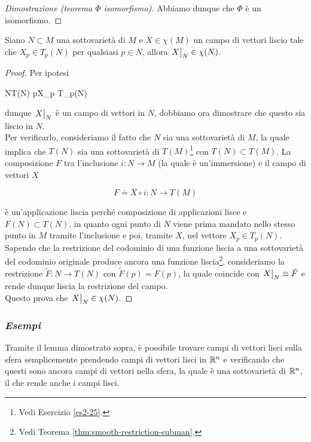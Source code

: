 \begin{proof}[Dimostrazione (teorema $ \Phi $ isomorfismo)]
Abbiamo dunque che $ \Phi $ è un isomorfismo.
\end{proof}

\begin{lemma}
	Siano $ N \subset M $ una sottovarietà di $ M $ e $ X \in \chi(M) $ un campo di vettori liscio tale che $ X_{p} \in T_{p}(N) $ per qualsiasi $ p \in N $, allora $ \eval{X}_{N} \in \chi(N) $.
\end{lemma}

\begin{proof}
	Per ipotesi
	
		{N}{T(N)}
		{p}{X_{p} \in T_{p}(N)}
	
	dunque $ \eval{X}_{N} $ è un campo di vettori in $ N $, dobbiamo ora dimostrare che questo sia liscio in $ N $.\\
	Per verificarlo, consideriamo il fatto che $ N $ sia una sottovarietà di $ M $, la quale implica che $ T(N) $ sia una sottovarietà di $ T(M) $\footnote{%
		Vedi Esercizio \ref{es2-25}.%
	} con $ T(N) \subset T(M) $. La composizione $ F $ tra l'inclusione $ i : N \to M $ (la quale è un'immersione) e il campo di vettori $ X $

	\begin{equation}
		F \doteq X \circ i : N \to T(M)
	\end{equation}

	è un'applicazione liscia perché composizione di applicazioni lisce e $ F(N) \subset T(N) $, in quanto ogni punto di $ N $ viene prima mandato nello stesso punto in $ M $ tramite l'inclusione e poi, tramite $ X $, nel vettore $ X_{p} \in T_{p}(N) $.\\
	Sapendo che la restrizione del codominio di una funzione liscia a una sottovarietà del codominio originale produce ancora una funzione liscia\footnote{%
		Vedi Teorema \ref{thm:smooth-restriction-subman}.%
	}, consideriamo la restrizione $ \tilde{F} : N \to T(N) $ con $ \tilde{F}(p) = F(p) $, la quale coincide con $ \eval{X}_{N} \equiv \tilde{F} $ e rende dunque liscia la restrizione del campo.\\
	Questo prova che $ \eval{X}_{N} \in \chi(N) $.
\end{proof}

\subsubsection{\textit{Esempi}}

Tramite il lemma dimostrato sopra, è possibile trovare campi di vettori lisci sulla sfera semplicemente prendendo campi di vettori lisci in $ \mathbb{R}^{n} $ e verificando che questi sono ancora campi di vettori nella sfera, la quale è una sottovarietà di $ \mathbb{R}^{n} $, il che rende anche i campi lisci.

